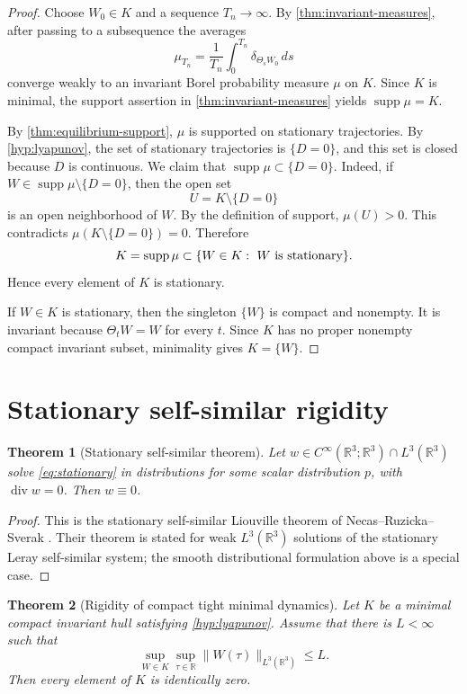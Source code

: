 \documentclass[11pt]{amsart}
\theoremstyle{plain}
\newtheorem{theorem}{Theorem}[section]
\theoremstyle{definition}
\theoremstyle{remark}
\numberwithin{equation}{section}
\begin{document}
\begin{proof}
Choose \(W_0\in K\) and a sequence \(T_n\to\infty\).  By
\cref{thm:invariant-measures}, after passing to a subsequence the averages
\[
   \mu_{T_n}
   =
   \frac1{T_n}\int_0^{T_n}\delta_{\Theta_sW_0}\,ds
\]
converge weakly to an invariant Borel probability measure \(\mu\) on \(K\).
Since \(K\) is minimal, the support assertion in
\cref{thm:invariant-measures} yields \(\operatorname{supp}\mu=K\).

By \cref{thm:equilibrium-support}, \(\mu\) is supported on stationary
trajectories.  By \cref{hyp:lyapunov}, the set of stationary trajectories is
\(\{D=0\}\), and this set is closed because \(D\) is continuous.  We claim
that \(\operatorname{supp}\mu\subset\{D=0\}\).  Indeed, if
\(W\in\operatorname{supp}\mu\setminus\{D=0\}\), then the open set
\[
   U=K\setminus\{D=0\}
\]
is an open neighborhood of \(W\).  By the definition of support,
\(\mu(U)>0\).  This contradicts \(\mu(K\setminus\{D=0\})=0\).  Therefore
\[
   K=\operatorname{supp}\mu
   \subset\{W\in K:\ W\hbox{ is stationary}\}.
\]
Hence every element of \(K\) is stationary.

If \(W\in K\) is stationary, then the singleton \(\{W\}\) is compact and
nonempty.  It is invariant because \(\Theta_tW=W\) for every \(t\).  Since
\(K\) has no proper nonempty compact invariant subset, minimality gives
\(K=\{W\}\).
\end{proof}

\section{Stationary self-similar rigidity}

\begin{theorem}[Stationary self-similar theorem]\label{thm:NRS}
Let \(w\in C^\infty(\mathbb R^3;\mathbb R^3)\cap L^3(\mathbb R^3)\) solve
\eqref{eq:stationary} in distributions for some scalar distribution \(p\),
with \(\operatorname{div}w=0\).  Then \(w\equiv0\).
\end{theorem}

\begin{proof}
This is the stationary self-similar Liouville theorem of
Necas--Ruzicka--Sverak \cite{NRS1996}.  Their theorem is stated for weak
\(L^3(\mathbb R^3)\) solutions of the stationary Leray self-similar system;
the smooth distributional formulation above is a special case.
\end{proof}

\begin{theorem}[Rigidity of compact tight minimal dynamics]\label{thm:no-compact-tight}
Let \(K\) be a minimal compact invariant hull satisfying
\cref{hyp:lyapunov}.  Assume that there is \(L<\infty\) such that
\[
   \sup_{W\in K}\sup_{\tau\in\mathbb R}
   \|W(\tau)\|_{L^3(\mathbb R^3)}\le L .
\]
Then every element of \(K\) is identically zero.
\end{theorem}
\end{document}
